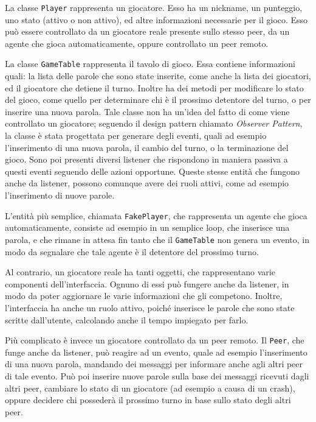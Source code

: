 \documentclass[10.5pt]{article}
\begin{document}
La classe \texttt{Player} rappresenta un giocatore. Esso ha un nickname, un punteggio, uno stato (attivo o non attivo), ed altre informazioni necessarie per il gioco. Esso può essere controllato da un giocatore reale presente sullo stesso peer, da un agente che gioca automaticamente, oppure controllato un peer remoto.

La classe \texttt{GameTable} rappresenta il tavolo di gioco. Essa contiene informazioni quali: la lista delle parole che sono state inserite, come anche la lista dei giocatori, ed il giocatore che detiene il turno. Inoltre ha dei metodi per modificare lo stato del gioco, come quello per determinare chi è il prossimo detentore del turno, o per inserire una nuova parola. Tale classe non ha un'idea del fatto di come viene controllato un giocatore; seguendo il design pattern chiamato \textit{Observer Pattern}, la classe è stata progettata per generare degli eventi, quali ad esempio l'inserimento di una nuova parola, il cambio del turno, o la terminazione del gioco. Sono poi presenti diversi listener che rispondono in maniera passiva a questi eventi seguendo delle azioni opportune. Queste stesse entità che fungono anche da listener, possono comunque avere dei ruoli attivi, come ad esempio l'inserimento di nuove parole. 

L'entità più semplice, chiamata \texttt{FakePlayer}, che rappresenta un agente che gioca automaticamente, consiste ad esempio in un semplice loop, che inserisce una parola, e che rimane in attesa fin tanto che il \texttt{GameTable} non genera un evento, in modo da segnalare che tale agente è il detentore del prossimo turno. 

Al contrario, un giocatore reale ha tanti oggetti, che rappresentano varie componenti dell'interfaccia. Ognuno di essi può fungere anche da listener, in modo da poter aggiornare le varie informazioni che gli competono. Inoltre, l'interfaccia ha anche un ruolo attivo, poiché inserisce le parole che sono state scritte dall'utente, calcolando anche il tempo impiegato per farlo.

Più complicato è invece un giocatore controllato da un peer remoto. Il \texttt{Peer}, che funge anche da listener, può reagire ad un evento, quale ad esempio l'inserimento di una nuova parola, mandando dei messaggi per informare anche agli altri peer di tale evento. Può poi inserire nuove parole sulla base dei messaggi ricevuti dagli altri peer, cambiare lo stato di un giocatore (ad esempio a causa di un crash), oppure decidere chi possederà il prossimo turno in base sullo stato degli altri peer.
\end{document}
